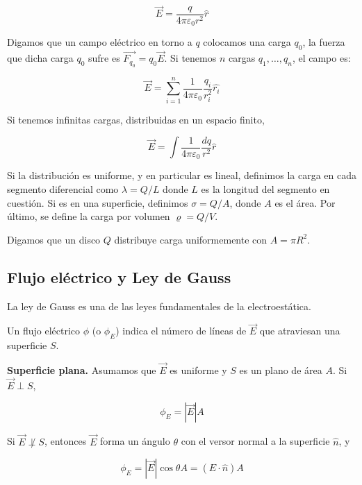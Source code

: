 \documentclass[12pt]{article}
\theoremstyle{definition}
\begin{document}
\begin{equation*}
    \vec{E} = \frac{q}{4\pi \varepsilon_0 r^2} \hat{r}
\end{equation*}

Digamos que un campo eléctrico en torno a $q$ colocamos una carga $q_0$, la
fuerza que dicha carga $q_0$ sufre es $\vec{F_{q_0}} = q_0 \vec{E}$. Si tenemos
$n$ cargas $q_1, \ldots, q_n$, el campo es:

\begin{equation*}
    \vec{E} = \sum_{i=1}^n \frac{1}{4\pi \varepsilon_0} \frac{q_i}{r_i^2}
    \hat{r_i}
\end{equation*}

Si tenemos infinitas cargas, distribuidas en un espacio finito, 

\begin{equation*}
    \vec{E} = \int \frac{1}{4\pi \varepsilon_0} \frac{dq}{r^2}\hat{r}
\end{equation*}

Si la distribución es uniforme, y en particular es lineal, definimos la carga en
cada segmento diferencial como $\lambda = Q / L$ donde $L$ es la longitud del
segmento en cuestión. Si es en una superficie, definimos $\sigma = Q / A$, donde
$A$ es el área. Por último, se define la carga por volumen $\varrho = Q / V$.


Digamos que un disco $Q$ distribuye carga uniformemente con $A = \pi R^2$. 

\subsection{Flujo eléctrico y Ley de Gauss}

La ley de Gauss es una de las leyes fundamentales de la electroestática.

Un flujo eléctrico $\phi$ (o $\phi_E$) indica el número de líneas de $\vec{E}$
que atraviesan una superficie $S$.

\textbf{Superficie plana.} Asumamos que $\vec{E}$ es uniforme y $S$ es un plano de área $A$. Si
$\vec{E} \perp S$, 

\begin{equation*}
    \phi_E = \left| \vec{E} \right| A
\end{equation*}

Si $\vec{E} \not\perp S$, entonces $\vec{E}$ forma un ángulo $\theta$ con el
versor normal a la superficie $\hat{n}$, y

\begin{equation*}
    \phi_E = \left| \vec{E} \right| \cos \theta A = (E \cdot \hat{n}) A
\end{equation*}
\end{document}
